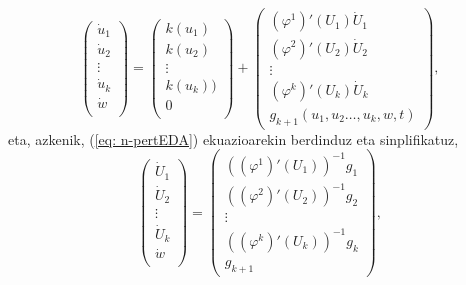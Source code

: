 \begin{equation*}
\left(\begin{array}{c}
                \dot{u}_1  \\
                \dot{u}_2  \\
                \vdots \\
                \dot{u}_k    \\
                \dot{w}      \\
\end{array}\right)=
\left(\begin{array}{c}
                k(u_1)  \\
                k(u_2)   \\
                \vdots \\
                k(u_k))   \\
                0      \\
\end{array}\right)+
\left(\begin{array}{c}
      (\varphi^1)'(U_1) \dot{U}_1 \\
      (\varphi^2)'(U_2) \dot{U}_2 \\
                \vdots \\
      (\varphi^k)'(U_k) \dot{U}_k\\
      g_{k+1}(u_1, u_2\dots, u_k,w,t)
\end{array}\right),
\end{equation*}
eta, azkenik, (\ref{eq: n-pertEDA}) ekuazioarekin berdinduz eta sinplifikatuz,
\begin{equation*}
\left(\begin{array}{c}
                \dot{U}_1  \\
                \dot{U}_2  \\
                \vdots \\
                \dot{U}_k    \\
                \dot{w}      \\
\end{array}\right)=
\left(\begin{array}{c}
      \left((\varphi^1)'(U_1)\right)^{-1} g_1 \\
      \left((\varphi^2)'(U_2)\right)^{-1} g_2 \\
                \vdots \\
     \left((\varphi^k)'(U_k)\right)^{-1} g_k\\
      g_{k+1}
\end{array}\right),
\end{equation*}

